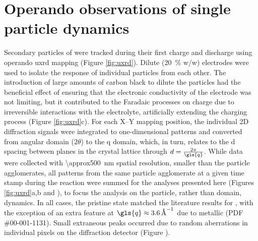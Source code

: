 \documentclass{WileyMSP-template}
\begin{document}
\section{Operando observations of single particle dynamics}


Secondary particles of \nca{} were tracked during their first charge
and discharge using operando \gls{uxrd} mapping (Figure
\ref{fig:uxrd}). Dilute (\SI{20}{\percent} w/w) \nca{} electrodes were
used to isolate the response of individual particles from each
other. The introduction of large amounts of carbon black to dilute the
particles had the beneficial effect of ensuring that the electronic
conductivity of the electrode was not limiting, but it contributed to
the Faradaic processes on charge due to irreversible interactions with
the electrolyte\cite{kostecki2014}, artificially extending the
charging process (Figure \ref{fig:uxrd}c). For each X--Y mapping
position, the individual 2D diffraction signals were integrated to
one-dimensional patterns and converted from angular domain ($2\theta$)
to the \gls{q} domain, which, in turn, relates to the d spacing
between planes in the crystal lattice through
$d=\frac{2\pi}{\gls{q}}$. While data were collected with
\SI{\approx500}{\nano\meter} spatial resolution, smaller than the
particle agglomerates, all patterns from the same particle agglomerate
at a given time stamp during the reaction were summed for the analyses
presented here (Figures \ref{fig:uxrd}a,b and
), to focus the analysis on the particle,
rather than domain, dynamics. In all cases, the pristine state matched
the literature results for \nca{} \cite{novak2015}, with the exception
of an extra feature at $\gls{q}\approx\SI{3.6}{\per\angstrom}$ due to
metallic  (PDF \#00-001-1131). Small extraneous peaks occurred
due to random aberrations in individual pixels on the diffraction
detector (Figure ).
\end{document}
